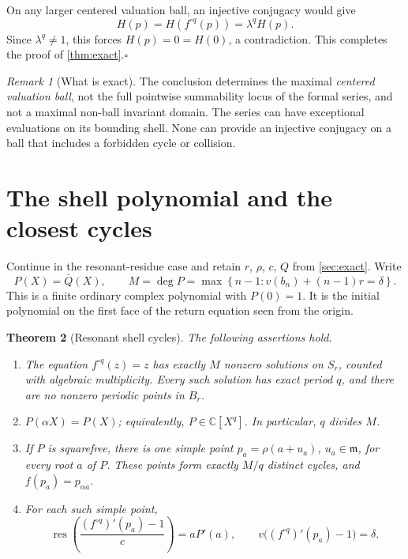 \documentclass[11pt,letterpaper]{article}
\numberwithin{equation}{section}
\theoremstyle{plain}
\newtheorem{theorem}{Theorem}[section]
\theoremstyle{definition}
\theoremstyle{remark}
\newtheorem{remark}[theorem]{Remark}
\newcommand{\C}{\mathbb C}
\newcommand{\mm}{\mathfrak m}
\newcommand{\res}{\operatorname{res}}
\begin{document}
On any larger centered valuation ball, an injective conjugacy would give
\[
 H(p)=H(f^{\circ q}(p))=\lambda^qH(p).
\]
Since $\lambda^q\ne1$, this forces $H(p)=0=H(0)$, a contradiction. This
completes the proof of \cref{thm:exact}.\hfill$\square$

\begin{remark}[What is exact]\label{rem:exact-scope}
The conclusion determines the maximal \emph{centered valuation ball}, not the
full pointwise summability locus of the formal series, and not a maximal
non-ball invariant domain. The series can have exceptional evaluations on
its bounding shell. None can provide an injective conjugacy on a ball that
includes a forbidden cycle or collision.
\end{remark}

\section{The shell polynomial and the closest cycles}\label{sec:shell}

Continue in the resonant-residue case and retain $r$, $\rho$, $c$, $Q$ from
\cref{sec:exact}. Write
\begin{equation}\label{eq:P}
 P(X)=\bar Q(X),\qquad
 M=\deg P
   =\max\left\{n-1:v(b_n)+(n-1)r=\delta\right\}.
\end{equation}
This is a finite ordinary complex polynomial with $P(0)=1$. It is the
initial polynomial on the first face of the return equation seen from the
origin.

\begin{theorem}[Resonant shell cycles]\label{thm:shell}
The following assertions hold.
\begin{enumerate}[label=(\roman*)]
\item The equation $f^{\circ q}(z)=z$ has exactly $M$ nonzero solutions on
$S_r$, counted with algebraic multiplicity. Every such solution has exact
period $q$, and there are no nonzero periodic points in $B_r$.
\item $P(\alpha X)=P(X)$; equivalently, $P\in\C[X^q]$. In particular,
$q$ divides $M$.
\item If $P$ is squarefree, there is one simple point
$p_a=\rho(a+u_a)$, $u_a\in\mm$, for every root $a$ of $P$. These points
form exactly $M/q$ distinct cycles, and $f(p_a)=p_{\alpha a}$.
\item For each such simple point,
\begin{equation}\label{eq:multiplier}
 \res\left(\frac{(f^{\circ q})'(p_a)-1}{c}\right)=aP'(a),
 \qquad v\bigl((f^{\circ q})'(p_a)-1\bigr)=\delta.
\end{equation}
\end{enumerate}
\end{theorem}
\end{document}
